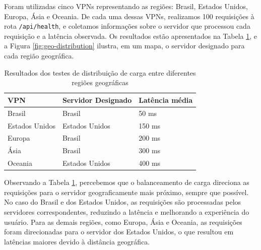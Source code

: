 Foram utilizadas cinco VPNs representando as regiões: Brasil, Estados Unidos, Europa, Ásia e Oceania. De cada uma dessas VPNs, realizamos 100 requisições à rota \texttt{/api/health}, e coletamos informações sobre o servidor que processou cada requisição e a latência observada. Os resultados estão apresentados na Tabela \ref{tab:geo-distribution}, e a Figura \ref{fig:geo-distribution} ilustra, em um mapa, o servidor designado para cada região geográfica.

\begin{table}[H]
    \centering
    \caption{Resultados dos testes de distribuição de carga entre diferentes regiões geográficas}
    \label{tab:geo-distribution}
    \begin{tabular}{|l|l|l|}
        \hline
        \textbf{VPN}   & \textbf{Servidor Designado} & \textbf{Latência média} \\ \hline
        Brasil         & Brasil                      & 50 ms                   \\ \hline
        Estados Unidos & Estados Unidos              & 150 ms                  \\ \hline
        Europa         & Brasil                      & 200 ms                  \\ \hline
        Ásia           & Brasil                      & 300 ms                  \\ \hline
        Oceania        & Estados Unidos              & 400 ms                  \\ \hline
    \end{tabular}
\end{table}


Observando a Tabela \ref{tab:geo-distribution}, percebemos que o balanceamento de carga direciona as requisições para o servidor geograficamente mais próximo, sempre que possível. No caso do Brasil e dos Estados Unidos, as requisições são processadas pelos servidores correspondentes, reduzindo a latência e melhorando a experiência do usuário. Para as demais regiões, como Europa, Ásia e Oceania, as requisições foram direcionadas para o servidor dos Estados Unidos, o que resultou em latências maiores devido à distância geográfica.

